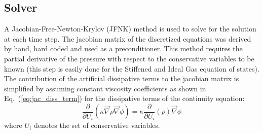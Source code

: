 \documentclass[preprint,10pt]{elsarticle}
\newcommand{\grad}{\vec{\nabla}}
\newcommand{\eqt}[1]{Eq.~(\ref{#1})}                     %
\begin{document}
\subsection{Solver} \label{sec:solver}
A Jacobian-Free-Newton-Krylov (JFNK) method is used to solve for the solution at each time step. The jacobian matrix of the discretized equations was derived by hand, hard coded and used as a preconditioner. This method requires the partial derivative of the pressure with respect to the conservative variables to be known (this step is easily done for the Stiffened and Ideal Gas equation of states). The contribution of the artificial dissipative terms to the jacobian matrix is simplified by assuming constant viscosity coefficients as shown in \eqt{eq:jac_diss_term} for the dissipative terms of the continuity equation:
\begin{equation}
\label{eq:jac_diss_term}
\frac{\partial}{\partial U_i} \left( \kappa \grad \rho \grad \phi \right) = \kappa \frac{\partial}{\partial U_i} \left( \rho \right) \grad \phi
\end{equation}  
where $U_i$ denotes the set of conservative variables.
\end{document}
